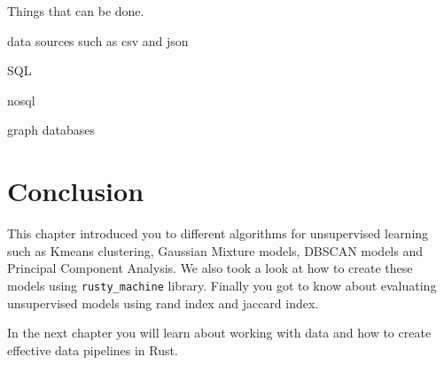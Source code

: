 \documentclass{book}
\begin{document}
Things that can be done.

data sources such as csv and json

SQL

nosql

graph databases


\section{Conclusion}%
This chapter introduced you to different algorithms for unsupervised learning such as Kmeans clustering, Gaussian Mixture models, DBSCAN models and Principal Component Analysis. We also took a look at how to create these models using \lstinline{rusty_machine} library. Finally you got to know about evaluating unsupervised models using rand index and jaccard index.

In the next chapter you will learn about working with data and how to create effective data pipelines in Rust.
\label{sec:conclusion}



\printbibliography
\nocite{*}
\end{document}
